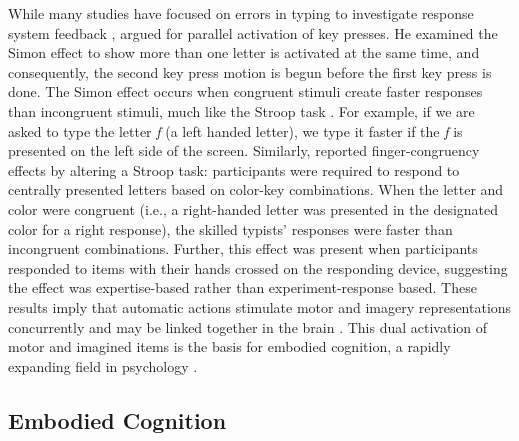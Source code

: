 \documentclass[english,man,man,mask]{apa6}
\theoremstyle{definition}
\theoremstyle{definition}
\theoremstyle{definition}
\theoremstyle{remark}
\begin{document}
While many studies have focused on errors in typing to investigate
response system feedback \autocite{Logan1999}, \textcite{Logan2003}
argued for parallel activation of key presses. He examined the Simon
effect to show more than one letter is activated at the same time, and
consequently, the second key press motion is begun before the first key
press is done. The Simon effect occurs when congruent stimuli create
faster responses than incongruent stimuli, much like the Stroop task
\autocites{Simon1990}{Simon1969}. For example, if we are asked to type
the letter \emph{f} (a left handed letter), we type it faster if the
\emph{f} is presented on the left side of the screen. Similarly,
\textcite{Rieger2004} reported finger-congruency effects by altering a
Stroop task: participants were required to respond to centrally
presented letters based on color-key combinations. When the letter and
color were congruent (i.e., a right-handed letter was presented in the
designated color for a right response), the skilled typists' responses
were faster than incongruent combinations. Further, this effect was
present when participants responded to items with their hands crossed on
the responding device, suggesting the effect was expertise-based rather
than experiment-response based. These results imply that automatic
actions stimulate motor and imagery representations concurrently and may
be linked together in the brain
\autocites{Hommel2001}{Logan1998}{Rieger2004}. This dual activation of
motor and imagined items is the basis for embodied cognition, a rapidly
expanding field in psychology \autocites{Barsalou1999}{Salthouse1986}.

\subsection{Embodied Cognition}\label{embodied-cognition}
\end{document}
